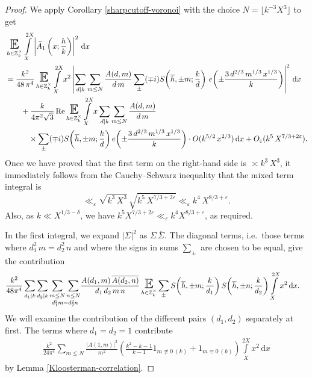 \documentclass[a4paper,10pt,twoside]{amsart}
\theoremstyle{definition}
\numberwithin{equation}{section}
\newcommand\E{\mathbb{E}}
\newcommand\eps{\varepsilon}
\renewcommand{\Re}{\textnormal{Re}}
\renewcommand\:{\colon}
\begin{document}
\begin{proof}
We apply Corollary \ref{sharpcutoff-voronoi} with the choice $N= \lfloor k^{-3}X^3\rfloor$ to get
\begin{align*}
&\mathop{\text{\LARGE$\E$}}_{h\in\mathbb Z_k^\times}\int\limits_X^{2X}\left|\widetilde A_1\left(x;\frac hk\right)\right|^2\,\mathrm dx\\
&=\frac{k^2}{48\,\pi^4}\mathop{\text{\LARGE$\E$}}_{h\in\mathbb Z_k^\times}\int\limits_X^{2X}x^{2}\left|\sum_{d\mid k}\sum_{m\leq N}\frac{A(d,m)}{d\,m}\sum_\pm (\mp i)S\!\left(\overline h,\pm m;\frac kd\right)\,e\!\left(\pm\frac{3\,d^{2/3}\,m^{1/3}\,x^{1/3}}k\right)\right|^2\,\mathrm dx\\
&\qquad+\frac{k}{4\pi^2\sqrt 3}\,\Re\mathop{\text{\LARGE$\E$}}_{h\in\mathbb Z_k^\times}\int\limits_X^{2X}x\sum_{d\mid k}\sum_{m\leq N}\frac{A(d,m)}{d\,m}\\&\hspace*{3em}\times\sum_\pm (\mp i) S\!\left(\overline h,\pm m;\frac kd\right)e\!\left(\pm\frac{3\,d^{2/3}\,m^{1/3}\,x^{1/3}}k\right)
\cdot O(k^{5/2}\,x^{2/3})\,\mathrm dx+O_\eps(k^{5}\,X^{7/3+2\eps}).
\end{align*}
Once we have proved that the first term on the right-hand side is $\asymp k^{3}\,X^{3}$, it immediately follows from the Cauchy--Schwarz inequality that the mixed term integral is
\[\ll_\eps\sqrt{k^{3}\,X^{3}}\,\sqrt{k^{5}\,X^{7/3+2\eps}}\ll_\eps k^{4}\,X^{8/3+\eps}.\]
Also, as $k\ll X^{1/3-\delta}$, we have $k^{5}X^{7/3+2\eps}\ll_\eps k^{4}X^{8/3+\eps}$, as required.
  
In the first integral, we expand $\left|\Sigma\right|^2$ as $\Sigma\,\overline\Sigma$. The diagonal terms, i.e.\ those terms where $d_1^2\,m=d_2^2\,n$ and where the signs in sums $\sum_\pm$ are chosen to be equal, give the contribution
\begin{align*}
&\frac{k^2}{48\pi^4}\sum_{d_1\mid k}\sum_{d_2\mid k}\underset{d_1^2m=d_2^2n}{\sum_{m\leq N}\sum_{n\leq N}}
\frac{A(d_1,m)\,\overline{A(d_2,n)}}{d_1\,d_2\,m\,n}\mathop{\text{\LARGE$\E$}}_{h\in\mathbb Z_k^\times}\sum_\pm S\!\left(\overline h,\pm m;\frac k{d_1}\right)S\!\left(\overline h,\pm n;\frac k{d_2}\right)
\int\limits_X^{2X}x^{2}\,\mathrm dx.     
\end{align*}
We will examine the contribution of the different pairs $(d_1,d_2)$ separately at first. The terms where $d_1=d_2=1$ contribute
\begin{align}\label{contribution1-A_1}
\frac{k^2}{24\pi^4}\sum_{m\leq N}\frac{\left|A(1,m)\right|^2}{m^{2}}\left(\frac{k^2-k-1}{k-1}1_{m\not\equiv 0\,(k)}+1_{m\equiv 0\,(k)}\right)\int\limits_X^{2X}x^2\,\mathrm dx
\end{align}
by Lemma \ref{Kloosterman-correlation}.


\end{proof}
\end{document}
